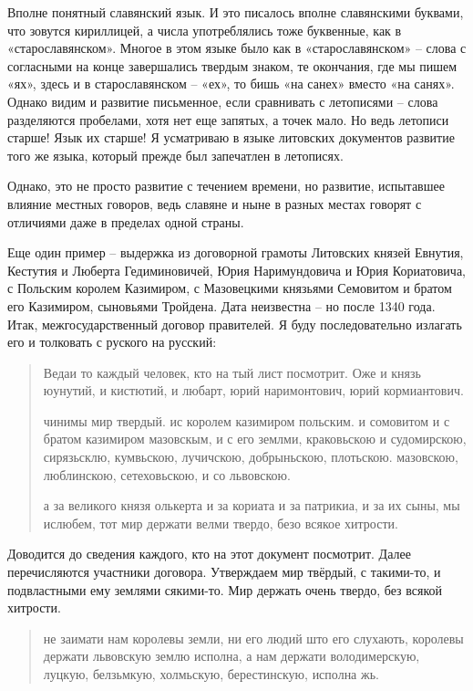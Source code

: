 Вполне понятный славянский язык. И это писалось вполне славянскими буквами, что зовутся кириллицей, а числа употреблялись тоже буквенные, как в «старославянском». Многое в этом языке было как в «старославянском» – слова с согласными на конце завершались твердым знаком, те окончания, где мы пишем «ях», здесь и в старославянском – «ех», то бишь «на санех» вместо «на санях». Однако видим и развитие письменное, если сравнивать с летописями – слова разделяются пробелами, хотя нет еще запятых, а точек мало. Но ведь летописи старше! Язык их старше! Я усматриваю в языке литовских документов развитие того же языка, который прежде был запечатлен в летописях.

Однако, это не просто развитие с течением времени, но развитие, испытавшее влияние местных говоров, ведь славяне и ныне в разных местах говорят с отличиями даже в пределах одной страны.

Еще один пример – выдержка из договорной грамоты Литовских князей Евнутия, Кестутия и Люберта Гедиминовичей, Юрия Наримундовича и Юрия Кориатовича, с Польским королем Казимиром, с Мазовецкими князьями Семовитом и братом его Казимиром, сыновьями Тройдена. Дата неизвестна – но после 1340 года. Итак, межгосударственный договор правителей. Я буду последовательно излагать его и толковать с руского на русский:

\begin{quotation}
Ведаи то каждый человек, кто на тый лист посмотрит. Оже и князь юунутий, и кистютий, и любарт, юрий наримонтович, юрий кормиантович.

чинимы мир твердый. ис королем казимиром польским. и сомовитом и с братом казимиром мазовскым, и с его землми, краковьскою и судомирскою, сирязьсклю, кумвьскою, лучичскою, добрыньскою, плотьскою. мазовскою, люблинскою, сетеховьскою, и со львовскою.

а за великого князя олькерта и за кориата и за патрикиа, и за их сыны, мы ислюбем, тот мир держати велми твердо, безо всякое хитрости.
\end{quotation}

Доводится до сведения каждого, кто на этот документ посмотрит. Далее перечисляются участники договора. Утверждаем мир твёрдый, с такими-то, и подвластными ему землями сякими-то. Мир держать очень твердо, без всякой хитрости.

\begin{quotation}
не заимати нам королевы земли, ни его людий што его слухають, королевы держати львовскую землю исполна, а нам держати володимерскую, луцкую, белзьмкую, холмьскую, берестинскую, исполна жь.
\end{quotation}

